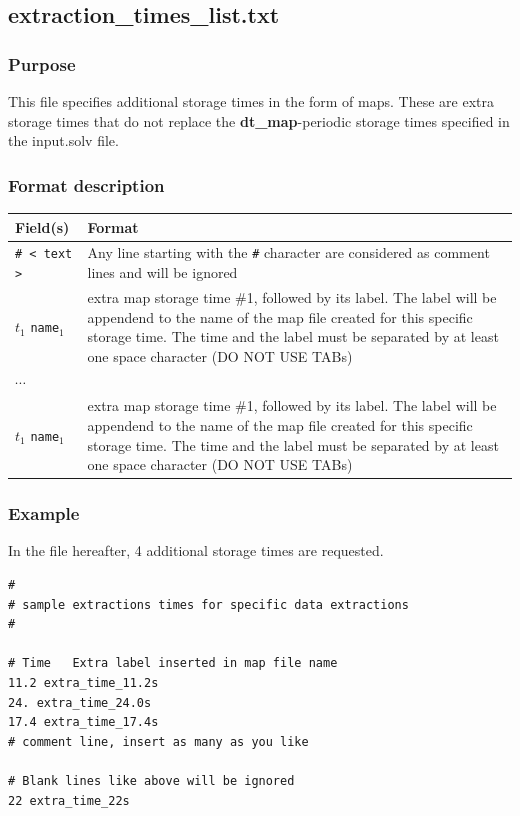 \subsection{extraction\_times\_list.txt}\label{sec:extraction_times_list}
\subsubsection{Purpose}
This file specifies additional storage times in the form of maps. These are extra storage times that do not replace the \textbf{dt\_map}-periodic storage times specified in the input.solv file.
%
\subsubsection{Format description}
\begin{tabular}{p{5cm} | p{10cm}}
\hline
Field(s) & Format \\
\hline
\hline
\texttt{\# < text >} & Any line starting with the \texttt{\#} character are considered as comment lines and will be ignored \\
\hline
$t_1$ \texttt{name}$_1$ & extra map storage time \#1, followed by its label. The label will be appendend to the name of the map file created for this specific storage time. The time and the label must be separated by at least one space character (DO NOT USE TABs) \\
\hline
$\cdots$ & \\
\hline
$t_1$ \texttt{name}$_1$ & extra map storage time \#1, followed by its label. The label will be appendend to the name of the map file created for this specific storage time. The time and the label must be separated by at least one space character (DO NOT USE TABs) \\
\hline
\end{tabular}
%
\subsubsection{Example}
In the file hereafter, 4 additional storage times are requested.
\begin{verbatim}
#
# sample extractions times for specific data extractions
#

# Time   Extra label inserted in map file name
11.2 extra_time_11.2s
24. extra_time_24.0s
17.4 extra_time_17.4s
# comment line, insert as many as you like

# Blank lines like above will be ignored
22 extra_time_22s
\end{verbatim}